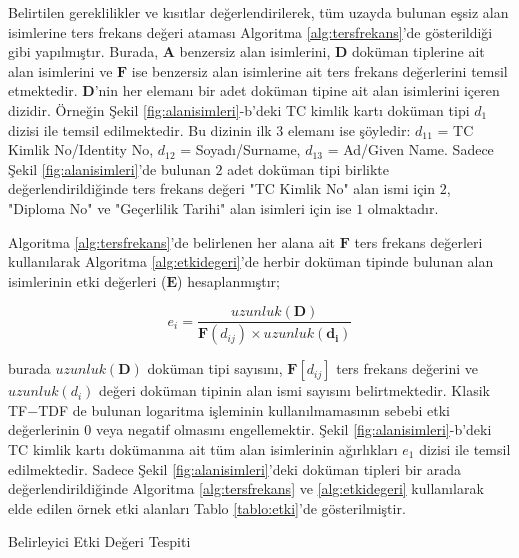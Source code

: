 \documentclass[conference, a4paper]{IEEEtran}
\begin{document}
Belirtilen gereklilikler ve kısıtlar değerlendirilerek, tüm uzayda bulunan eşsiz alan isimlerine ters frekans değeri
ataması Algoritma \ref{alg:tersfrekans}'de gösterildiği gibi yapılmıştır. Burada, $\mathbf{A}$ benzersiz alan
isimlerini, $\mathbf{D}$ doküman tiplerine ait alan isimlerini ve  $\mathbf{F}$ ise benzersiz alan isimlerine ait ters
frekans değerlerini temsil etmektedir. $\mathbf{D}$'nin her elemanı bir adet doküman tipine ait alan isimlerini içeren
dizidir. Örneğin Şekil \ref{fig:alanisimleri}-b'deki TC kimlik kartı doküman tipi $d_1$ dizisi ile temsil edilmektedir.
Bu dizinin ilk $3$ elemanı ise şöyledir: $d_{11}$ = TC Kimlik No/Identity No, $d_{12}$ = Soyadı/Surname, $d_{13}$ =
Ad/Given Name. Sadece Şekil \ref{fig:alanisimleri}'de bulunan $2$ adet doküman tipi birlikte değerlendirildiğinde ters
frekans değeri "TC Kimlik No" alan ismi için $2$, "Diploma No" ve "Geçerlilik Tarihi" alan isimleri için ise $1$
olmaktadır.

Algoritma \ref{alg:tersfrekans}'de belirlenen her alana ait $\mathbf{F}$ ters frekans değerleri kullanılarak Algoritma
\ref{alg:etkidegeri}'de herbir doküman tipinde bulunan alan isimlerinin etki değerleri ($\mathbf{E}$) hesaplanmıştır;

\begin{equation}
    e_i = \frac{uzunluk(\mathbf{D})}{\mathbf{F}(d_{ij}) \times uzunluk(\mathbf{d_i})}
\end{equation}{}

\noindent burada $uzunluk(\mathbf{D})$ doküman tipi sayısını, $\mathbf{F}[d_{ij}]$ ters frekans değerini ve
$uzunluk(d_i)$ değeri doküman tipinin alan ismi sayısını belirtmektedir. Klasik TF$-$TDF de bulunan logaritma
işleminin kullanılmamasının sebebi etki değerlerinin $0$ veya negatif olmasını engellemektir.
Şekil \ref{fig:alanisimleri}-b'deki TC kimlik kartı dokümanına ait tüm alan isimlerinin ağırlıkları $e_1$ dizisi ile
temsil edilmektedir. Sadece Şekil \ref{fig:alanisimleri}'deki doküman tipleri bir arada değerlendirildiğinde Algoritma
\ref{alg:tersfrekans} ve \ref{alg:etkidegeri} kullanılarak elde edilen örnek etki alanları Tablo \ref{tablo:etki}'de
gösterilmiştir.

\begin{algorithm}
    \SetAlgoLined
    \caption{Belirleyici Etki Değeri Tespiti}
    \label{alg:etkidegeri}
\end{algorithm}
\end{document}

